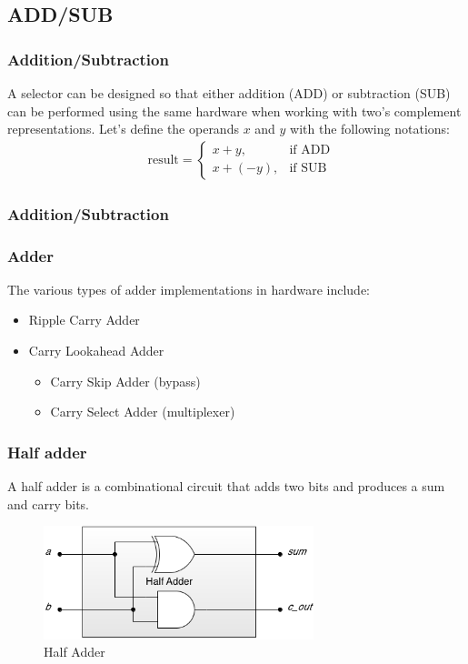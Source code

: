 \subsection{ADD/SUB}
\begin{frame}
    \frametitle{Addition/Subtraction}
    A selector can be designed so that either addition (ADD) or subtraction (SUB)
    can be performed using the same hardware when working with two's complement representations.
    Let's define the operands $x$ and $y$ with the following notations:
    \begin{equation}
        \begin{aligned}
            &\text{result} =
            \begin{cases}
                x + y, & \text{if ADD} \\
                x + (-y), & \text{if SUB}
            \end{cases}
        \end{aligned}
    \end{equation}
\end{frame}

\begin{frame}
    \frametitle{Addition/Subtraction}
\end{frame}

\begin{frame}
    \frametitle{Adder}
    The various types of adder implementations in hardware include:
    \begin{itemize}
        \item Ripple Carry Adder
        \item Carry Lookahead Adder
            \begin{itemize}
                \item Carry Skip Adder (bypass)
                \item Carry Select Adder (multiplexer)
            \end{itemize}
    \end{itemize}
\end{frame}

\begin{frame}
    \frametitle{Half adder}
 A half adder is a combinational circuit that adds two bits and produces a sum and carry bits.
    \begin{figure}
        \centering
        \includegraphics[width=0.7\textwidth]{media/half-adder-gates.png}
        \caption{Half Adder}
    \end{figure}
\end{frame}

